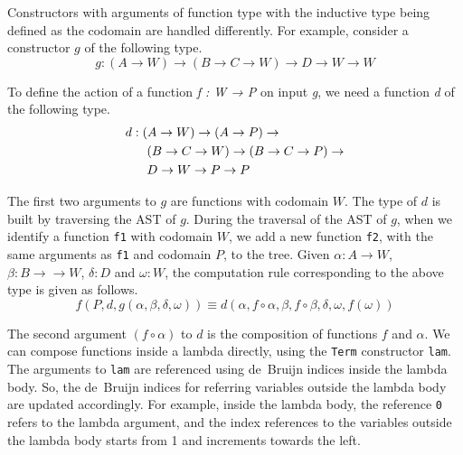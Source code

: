 \documentclass[sigplan,10pt]{acmart}
\begin{document}
Constructors with arguments of function type with the inductive type being defined as the codomain are handled differently. For example, consider a constructor $g$ of the following type.
\begin{equation}
g : (A \rightarrow W) \rightarrow (B \rightarrow C \rightarrow W) \rightarrow D \rightarrow W \rightarrow W \nonumber
\end{equation}

To define the action of a function \emph{f : W → P} on input \emph{g}, we need a function \emph{d} of the following type.
\begin{align}
& d : (A \rightarrow W) \rightarrow (A \rightarrow P) \rightarrow \nonumber \\
& \hspace {0.6cm} (B \rightarrow C \rightarrow W) \rightarrow (B \rightarrow C \rightarrow P) \rightarrow \nonumber \\ 
& \hspace {0.6cm} D \rightarrow W \rightarrow P \rightarrow P \nonumber
\end{align}

The first two arguments to $g$ are functions with codomain $W$. The type of $d$ is built by traversing the AST of $g$. During the traversal of the AST of $g$, when we identify a function {\tt f1} with codomain $W$, we add a new function {\tt f2}, with the same arguments as {\tt f1} and codomain $P$, to the tree. Given $\alpha : A \rightarrow W$, $\beta : B \rightarrow \rightarrow W$, $\delta : D$ and $\omega : W$, the computation rule corresponding to the above type is given as follows.
\begin{equation}
f (P, d, g (\alpha, \beta, \delta, \omega)) \equiv d (\alpha, f \circ \alpha, \beta, f \circ \beta, \delta, \omega, f (\omega)) \nonumber
\end{equation}

The second argument $(f \circ \alpha)$ to $d$ is the composition of functions $f$ and $\alpha$. We can compose functions inside a lambda directly, using the \texttt{Term} constructor {\tt lam}. The arguments to {\tt lam} are referenced using de~Bruijn indices inside the lambda body. So, the de~Bruijn indices for referring variables outside the lambda body are updated accordingly. For example, inside the lambda body, the reference {\tt 0} refers to the lambda argument, and the index references to the variables outside the lambda body starts from 1 and increments towards the left.
\end{document}
